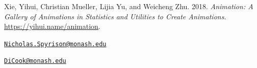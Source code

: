 \leavevmode\hypertarget{ref-xie_animation:_2018}{}%
Xie, Yihui, Christian Mueller, Lijia Yu, and Weicheng Zhu. 2018. \emph{Animation: A Gallery of Animations in Statistics and Utilities to Create Animations}. \url{https://yihui.name/animation}.



\address{%
Nicholas Spyrison\\
Monash University\\
School of Information Technology\\ Monash University, Melbourne, VIC 3800, Australia\\
}
\href{mailto:Nicholas.Spyrison@monash.edu}{\nolinkurl{Nicholas.Spyrison@monash.edu}}

\address{%
Dianne Cook\\
Monash University\\
School of Econometrics and Business Statistics\\ Monash University, Melbourne, VIC 3800, Australia\\
}
\href{mailto:DiCook@monash.edu}{\nolinkurl{DiCook@monash.edu}}

